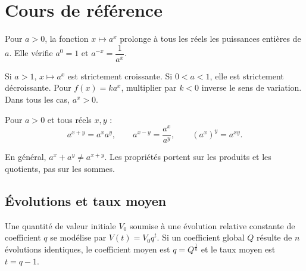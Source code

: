 
\section{Cours de référence}
Pour $a>0$, la fonction $x\mapsto a^x$ prolonge à tous les réels les puissances entières de $a$. Elle vérifie $a^0=1$ et $a^{-x}=\dfrac{1}{a^x}$.

\begin{center}
\end{center}

\begin{keypoint}
Si $a>1$, $x\mapsto a^x$ est strictement croissante. Si $0<a<1$, elle est strictement décroissante. Pour $f(x)=ka^x$, multiplier par $k<0$ inverse le sens de variation. Dans tous les cas, $a^x>0$.
\end{keypoint}

Pour $a>0$ et tous réels $x,y$ :
\[
a^{x+y}=a^xa^y,\qquad a^{x-y}=\frac{a^x}{a^y},\qquad (a^x)^y=a^{xy}.
\]

\begin{pitfall}
En général, $a^x+a^y\neq a^{x+y}$. Les propriétés portent sur les produits et les quotients, pas sur les sommes.
\end{pitfall}

\subsection{Évolutions et taux moyen}
Une quantité de valeur initiale $V_0$ soumise à une évolution relative constante de coefficient $q$ se modélise par $V(t)=V_0q^t$. Si un coefficient global $Q$ résulte de $n$ évolutions identiques, le coefficient moyen est $q=Q^{\frac1n}$ et le taux moyen est $t=q-1$.

